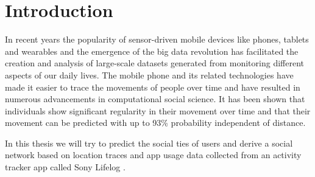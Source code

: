 \section{Introduction}
In recent years the popularity of sensor-driven mobile devices like phones, tablets and wearables and the emergence of the big data revolution has facilitated the creation and analysis of large-scale datasets generated from monitoring different aspects of our daily lives\cite{lazer2009life}. The mobile phone and its related technologies have made it easier to trace the movements of people over time and have resulted in numerous advancements in computational social science. It has been shown that individuals show significant regularity in their movement over time\cite{Uihmp} and that their movement can be predicted with up to 93\% probability independent of distance\cite{LoPiHM}.

In this thesis we will try to predict the social ties of users and derive a social network based on location traces and app usage data collected from an activity tracker app called Sony Lifelog \cite{sonyLifeLog}.

